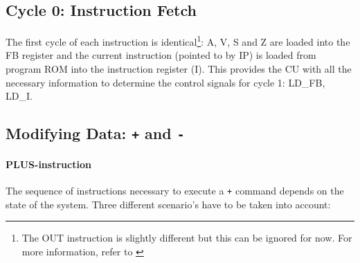 \subsection{Cycle 0: Instruction Fetch}
The first cycle of each instruction is identical\footnote{The OUT instruction is slightly different but this can be ignored for now. For more information, refer to \label{sec:sequences:output}}: A, V, S and Z are loaded into the FB register and the current instruction (pointed to by IP) is loaded from program ROM into the instruction register (I). This provides the CU with all the necessary information to determine the control signals for cycle 1: LD\_FB, LD\_I.

\subsection{Modifying Data: \texttt{+} and \texttt{-}} \label{sec:sequences:+-}
\paragraph{PLUS-instruction} The sequence of instructions necessary to execute a \texttt{+} command depends on the state of the system. Three different scenario's have to be taken into account:

